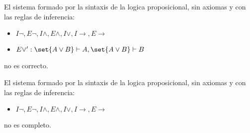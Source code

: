 \begin{example}
	El sistema formado por la sintaxis de la logica proposicional, sin axiomas y con las reglas de inferencia:
	\begin{itemize}
		\item \(I\neg, E\neg, I\wedge, E \wedge, I \vee, I \to, E \to \)
		\item \(E \vee^\prime: \set{A \vee B} \vdash A, \set{A \vee B} \vdash B \)
	\end{itemize}
	no es correcto.
\end{example}
\begin{example}
	El sistema formado por la sintaxis de la logica proposicional, sin axiomas y con las reglas de inferencia:
	\begin{itemize}
		\item \(I\neg, E\neg, I \wedge, E \wedge , I \vee , I \to, E \to \)
	\end{itemize}
	no es completo.
\end{example}


